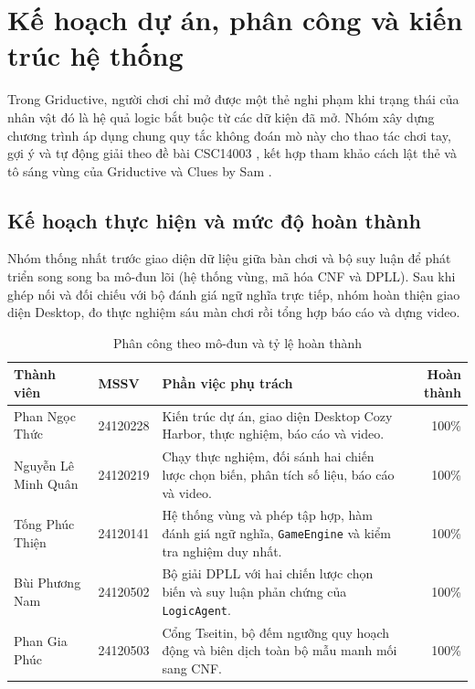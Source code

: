 \section{Kế hoạch dự án, phân công và kiến trúc hệ thống}

Trong Griductive, người chơi chỉ mở được một thẻ nghi phạm khi trạng thái của nhân vật đó là hệ quả logic bắt buộc từ các dữ kiện đã mở. Nhóm xây dựng chương trình áp dụng chung quy tắc không đoán mò này cho thao tác chơi tay, gợi ý và tự động giải theo đề bài CSC14003 \cite{csc14003_spec}, kết hợp tham khảo cách lật thẻ và tô sáng vùng của Griductive và Clues by Sam \cite{griductive_game,cluesbysam}.

\subsection{Kế hoạch thực hiện và mức độ hoàn thành}

Nhóm thống nhất trước giao diện dữ liệu giữa bàn chơi và bộ suy luận để phát triển song song ba mô-đun lõi (hệ thống vùng, mã hóa CNF và DPLL). Sau khi ghép nối và đối chiếu với bộ đánh giá ngữ nghĩa trực tiếp, nhóm hoàn thiện giao diện Desktop, đo thực nghiệm sáu màn chơi rồi tổng hợp báo cáo và dựng video.

\begin{table}[H]
\centering\small\singlespacing
\caption{Phân công theo mô-đun và tỷ lệ hoàn thành}
\smallskip
\renewcommand{\arraystretch}{1.23}
\begin{tabularx}{\linewidth}{@{}l l >{\raggedright\arraybackslash}X r@{}}
\toprule
\textbf{Thành viên} & \textbf{MSSV} & \textbf{Phần việc phụ trách} & \textbf{Hoàn thành} \\
\midrule
Phan Ngọc Thức & 24120228 & Kiến trúc dự án, giao diện Desktop Cozy Harbor, thực nghiệm, báo cáo và video. & 100\% \\
Nguyễn Lê Minh Quân & 24120219 & Chạy thực nghiệm, đối sánh hai chiến lược chọn biến, phân tích số liệu, báo cáo và video. & 100\% \\
Tống Phúc Thiện & 24120141 & Hệ thống vùng và phép tập hợp, hàm đánh giá ngữ nghĩa, \texttt{GameEngine} và kiểm tra nghiệm duy nhất. & 100\% \\
Bùi Phương Nam & 24120502 & Bộ giải DPLL với hai chiến lược chọn biến và suy luận phản chứng của \texttt{LogicAgent}. & 100\% \\
Phan Gia Phúc & 24120503 & Cổng Tseitin, bộ đếm ngưỡng quy hoạch động và biên dịch toàn bộ mẫu manh mối sang CNF. & 100\% \\
\bottomrule
\end{tabularx}
\end{table}

